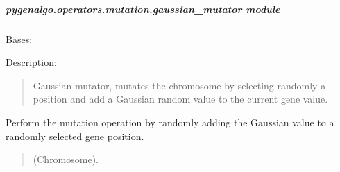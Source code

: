 \documentclass[letterpaper,10pt,english]{sphinxmanual}
\begin{document}
\subparagraph{pygenalgo.operators.mutation.gaussian\_mutator module}
\label{\detokenize{pygenalgo.operators.mutation:module-pygenalgo.operators.mutation.gaussian_mutator}}\label{\detokenize{pygenalgo.operators.mutation:pygenalgo-operators-mutation-gaussian-mutator-module}}

\begin{fulllineitems}
\label{\detokenize{pygenalgo.operators.mutation:pygenalgo.operators.mutation.gaussian_mutator.GaussianMutator}}
\pysigstartsignatures
{}
\pysigstopsignatures
\sphinxAtStartPar
Bases: {\hyperref[\detokenize{pygenalgo.operators.mutation:pygenalgo.operators.mutation.mutate_operator.MutationOperator}]{}}

\sphinxAtStartPar
Description:
\begin{quote}

\sphinxAtStartPar
Gaussian mutator, mutates the chromosome by selecting randomly a position
and add a Gaussian random value to the current gene value.
\end{quote}

\begin{fulllineitems}
\label{\detokenize{pygenalgo.operators.mutation:pygenalgo.operators.mutation.gaussian_mutator.GaussianMutator.mutate}}
\pysigstartsignatures
{}
\pysigstopsignatures
\sphinxAtStartPar
Perform the mutation operation by randomly adding the
Gaussian value to a randomly selected gene position.
\begin{quote}\begin{description}
\sphinxAtStartPar
{} \textendash{} (Chromosome).


\end{description}
\end{quote}
\end{fulllineitems}
\end{fulllineitems}
\end{document}
